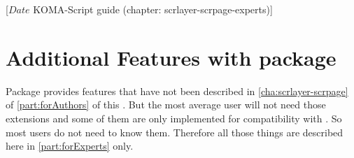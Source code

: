 %
%
%
%
%
%
%
%
% 
%
%
%
%

%
                 [$Date$
                  KOMA-Script guide (chapter: scrlayer-scrpage-experts)]


\chapter[{Additional Features of \Package{scrlayer-scrpage}}]
  {Additional Features with
    package }
%
%
Package  provides features that have not been
described in \autoref{cha:scrlayer-scrpage} of \autoref{part:forAuthors} of this
. But the most average user will not need those
extensions and some of them are only implemented for compatibility with
. So most users do not need to know them. Therefore all those
things are described here in \autoref{part:forExperts} only.

